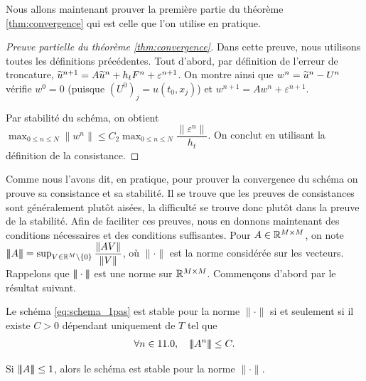 \documentclass[12pt,a4paper,twoside]{article}
\begin{document}
Nous allons maintenant prouver la premi\`ere partie du th\'eor\`eme \ref{thm:convergence}
qui est celle que l'on utilise en pratique.
\begin{proof}[Preuve partielle du th\'eor\`eme \ref{thm:convergence}]
  Dans cette preuve, nous utilisons toutes les d\'efinitions pr\'ec\'edentes.
  Tout d'abord, par d\'efinition de l'erreur de troncature,
  $\widetilde{u}^{n+1} = A \widetilde{u}^n + h_t F^n + \varepsilon^{n+1}$.
  On montre ainsi que
  $w^n = \widetilde{u}^{n} - U^{n}$ v\'erifie $w^0 = 0$ 
  (puisque $(U^0)_j = u(t_0,x_j)$) et
  $w^{n+1} = A w^n + \varepsilon^{n+1}$.

  Par stabilit\'e du sch\'ema, on obtient
  $\max_{0\leq n \leq N} \| w^n \|
  \leq C_2 \max_{0\leq n \leq N} \dfrac{\| \varepsilon^n \|}{h_t}$.
  On conclut en utilisant la d\'efinition de la consistance.
\end{proof}



Comme nous l'avons dit, en pratique, pour prouver la convergence du sch\'ema
on prouve sa consistance et sa stabilit\'e.
Il se trouve que les preuves de consistances sont g\'en\'eralement plut\^ot
ais\'ees, la difficult\'e se trouve donc plut\^ot dans la preuve de la stabilit\'e.
Afin de faciliter ces preuves,
nous en donnons maintenant des conditions n\'ecessaires et des conditions
suffisantes.
Pour $A \in \mathbb{R}^{M \times M}$, on note 
$|\!|\!| A |\!|\!| = \sup_{V \in \mathbb{R}^{M} \backslash\{0\}} \dfrac{\| A V \|}{\| V \|}$,
o\`u $\| \cdot \|$ est la norme consid\'er\'ee sur les vecteurs.
Rappelons que $|\!|\!| \cdot |\!|\!|$ est une norme sur $\mathbb{R}^{M \times M}$.
Commen\c{c}ons d'abord par le r\'esultat suivant.
\begin{proposition}
  \label{prop:carac_stab}
  Le sch\'ema \eqref{eq:schema_1pas} est stable pour la norme $\| \cdot \|$ si et seulement si
  il existe $C>0$ d\'ependant uniquement de $T$ tel que
  \begin{align}
    \label{eq:carac_stab}
    \forall n \in 11.0 , \quad |\!|\!| A^n |\!|\!| \leq C .
  \end{align}
\end{proposition}

\begin{corrolary}
  \label{corro:stability}
  Si $|\!|\!| A |\!|\!| \leq 1$, alors le sch\'ema est stable pour la norme $\| \cdot \|$.
\end{corrolary}
\end{document}
